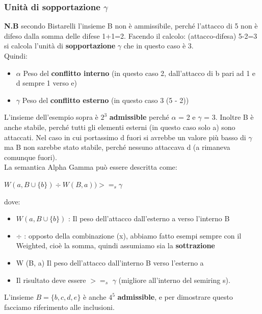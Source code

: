     \subsubsection{Unità di sopportazione $\gamma$}
    \textbf{N.B} secondo Bistarelli l'insieme B non è ammissibile, perché l'attacco di 5 non è difeso dalla somma delle difese 1+1=2. Facendo il calcolo: (attacco-difesa) 5-2=3 si calcola l'unità di \textbf{sopportazione} $\gamma$ che in questo caso è 3.
    \\Quindi:
    \begin{itemize}
        \item $\alpha$ Peso del \textbf{conflitto interno} (in questo caso 2, dall'attacco di b pari ad 1 e d sempre 1 verso e)
        \item $\gamma$ Peso del \textbf{conflitto esterno} (in questo caso 3 (5 - 2))
    \end{itemize}
    L'insieme dell'esempio sopra è $2^3$ \textbf{admissible} perché $\alpha$ = 2 e $\gamma$ = 3. Inoltre B è anche stabile, perché tutti gli elementi esterni (in questo caso solo a) sono attaccati. Nel caso in cui portassimo d fuori si avrebbe un valore più basso di $\gamma$ ma B non sarebbe stato stabile, perché nessuno attaccava d (a rimaneva comunque fuori).
    \\
    La semantica Alpha Gamma può essere descritta come:
    \begin{center}
        $W (a, B \cup \{b\}) \div W (B, a)) >=_s \gamma$
    \end{center}
    dove:
    \begin{itemize}
        \item $W (a, B \cup \{b\})$ : Il peso dell'attacco dall'esterno a verso l'interno B
        \item $\div$ : opposto della combinazione (x), abbiamo fatto esempi sempre con il Weighted, cioè la somma, quindi assumiamo sia la \textbf{sottrazione}
        \item W (B, a) Il peso dell'attacco dall'interno B verso l'esterno a
        \item Il risultato deve essere $>=_s$ $\gamma$ (migliore all'interno del semiring s).
    \end{itemize}
    L'insieme $B = \{b, c, d, e\}$ è anche $4^5$ \textbf{admissible}, e per dimostrare questo facciamo riferimento alle inclusioni.

